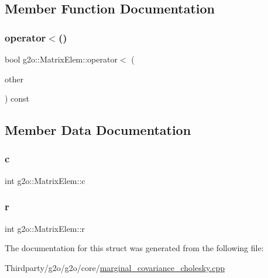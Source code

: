 \subsection{Member Function Documentation}
\mbox{\label{structg2o_1_1_matrix_elem_ae66d518ebb04f9ba74a9d2195020ff63}} 
\subsubsection{\texorpdfstring{operator$<$()}{operator<()}}
{\footnotesize\ttfamily bool g2o\+::\+Matrix\+Elem\+::operator$<$ (\begin{DoxyParamCaption}\item[{const \mbox{\hyperlink{structg2o_1_1_matrix_elem}{Matrix\+Elem}} \&}]{other }\end{DoxyParamCaption}) const\hspace{0.3cm}{\ttfamily [inline]}}



\subsection{Member Data Documentation}
\mbox{\label{structg2o_1_1_matrix_elem_a32574586352669720ba955c1b8cafbc4}} 
\subsubsection{\texorpdfstring{c}{c}}
{\footnotesize\ttfamily int g2o\+::\+Matrix\+Elem\+::c}

\mbox{\label{structg2o_1_1_matrix_elem_a5943163fa13505b2d2d9204f3fe61629}} 
\subsubsection{\texorpdfstring{r}{r}}
{\footnotesize\ttfamily int g2o\+::\+Matrix\+Elem\+::r}



The documentation for this struct was generated from the following file\+:\begin{DoxyCompactItemize}
\item 
Thirdparty/g2o/g2o/core/\mbox{\hyperlink{marginal__covariance__cholesky_8cpp}{marginal\+\_\+covariance\+\_\+cholesky.\+cpp}}\end{DoxyCompactItemize}
